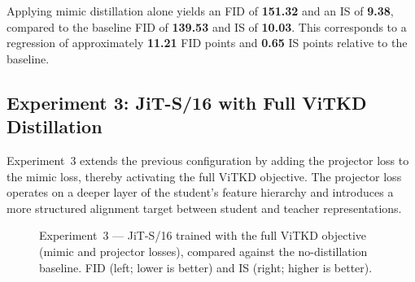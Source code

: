 Applying mimic distillation alone yields an FID of \textbf{151.32} and an
IS of \textbf{9.38}, compared to the baseline FID of \textbf{139.53} and
IS of \textbf{10.03}. This corresponds to a regression of
approximately \textbf{11.21} FID points and \textbf{0.65} IS points
relative to the baseline.

\subsection{Experiment 3: JiT-S/16 with Full ViTKD Distillation}
\label{subsec:exp3}

Experiment~3 extends the previous configuration by adding the projector
loss to the mimic loss, thereby activating the full ViTKD objective. The
projector loss operates on a deeper layer of the student's feature
hierarchy and introduces a more structured alignment target between student
and teacher representations.

\begin{figure}[ht]
    \centering
    \begin{subfigure}[b]{0.44\linewidth}
        \centering
    \end{subfigure}
    \hfill
    \begin{subfigure}[b]{0.44\linewidth}
        \centering
    \end{subfigure}
    \caption{Experiment~3 — JiT-S/16 trained with the full ViTKD objective
    (mimic and projector losses), compared against the no-distillation
    baseline. FID (left; lower is better) and IS (right; higher is better).}
    \label{fig:exp3_results}
\end{figure}

